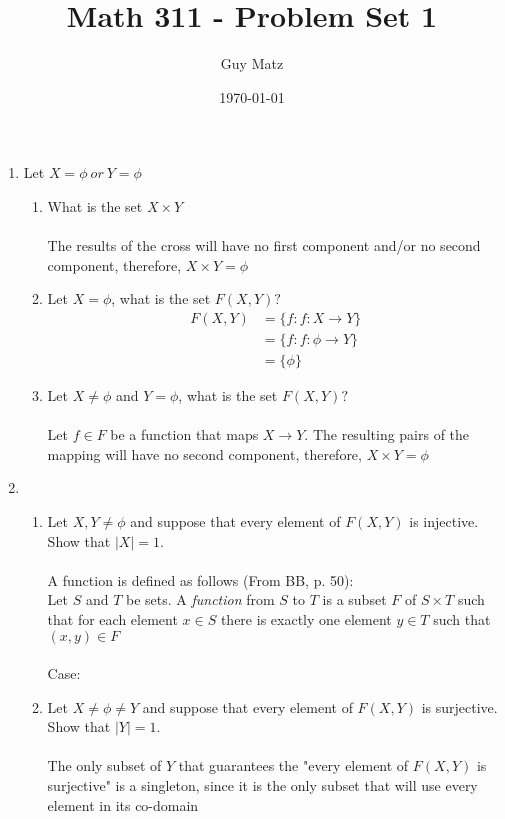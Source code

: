 \documentclass[11pt]{article}
\title{\textbf{Math 311 - Problem Set 1}}
\author{Guy Matz}
\date{\today}
\begin{document}
\maketitle

\newpage

\begin{enumerate}  %
\item Let $X = \phi \ or \ Y = \phi$

\begin{enumerate} %
\item What is the set $X \times Y$\\ \\
The results of the cross will have no first component and/or no second component, therefore, $X \times Y = \phi$\\
\item Let $X = \phi$, what is the set $F(X,Y)?$
\begin{align*}
F(X,Y) &= \{f: f:X \to Y\}
\\     &= \{f: f:\phi \to Y\}
\\     &= \{ \phi \}
\end{align*}

\item Let $X \neq \phi$ and $Y = \phi$, what is the set $F(X,Y)?$\\ \\
Let $f \in F$ be a function that maps $X \to Y$.  The resulting pairs of the mapping will have no second component, therefore, $X \times Y = \phi$\\
\end{enumerate} %

\newpage

\item

\begin{enumerate} %
\item Let $X, Y \neq \phi$ and suppose that every element of $F(X,Y)$ is injective.  Show that $|X| = 1$.
\\ \\
A function is defined as follows (From BB, p. 50):\\
Let $S$ and $T$ be sets. A \emph{function} from $S$ to $T$ is a subset $F$ of $S \times T$ such that for each element $x \in S$ there is exactly one element  $y \in T$ such that $(x,y) \in F$
\\ \\
Case: 
\\
\item Let $X \neq \phi \neq Y$ and suppose that every element of $F(X,Y)$ is surjective.  Show that $|Y| = 1$.
\\ \\
The only subset of $Y$ that guarantees the "every element of $F(X,Y)$ is surjective" is a singleton, since it is the only subset that will use every element in its co-domain
\\


\end{enumerate}
\end{enumerate}
\end{document}

